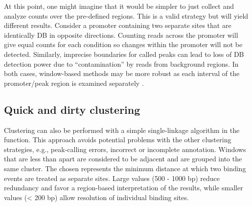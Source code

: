 \documentclass{report}\usepackage[]{graphicx}\usepackage[usenames,dvipsnames]{color}
\newcommand{\hlopt}[1]{\textcolor[rgb]{0,0,0}{#1}}%
\newcommand{\hlstd}[1]{\textcolor[rgb]{0.251,0.251,0.251}{#1}}%
\newcommand{\hlkwb}[1]{\textcolor[rgb]{0,0,0}{#1}}%
\newcommand{\hlkwd}[1]{\textcolor[rgb]{0.878,0.439,0.125}{#1}}%
\newenvironment{knitrout}{}{} %
\begin{document}
\begin{knitrout}
\color{fgcolor}
\end{knitrout}

At this point, one might imagine that it would be simpler to just collect and analyze counts over the pre-defined regions. 
This is a valid strategy but will yield different results. 
Consider a promoter containing two separate sites that are identically DB in opposite directions. 
Counting reads across the promoter will give equal counts for each condition so changes within the promoter will not be detected. 
Similarly, imprecise boundaries for called peaks can lead to loss of DB detection power due to ``contamination'' by reads from background regions. 
In both cases, window-based methods may be more robust as each interval of the promoter/peak region is examined separately \cite{lun2014}.

\subsection{Quick and dirty clustering}
\label{sec:cluster}
Clustering can also be performed with a simple single-linkage algorithm in the  function.
This approach avoids potential problems with the other clustering strategies, e.g., peak-calling errors, incorrect or incomplete annotation. 
Windows that are less than  apart are considered to be adjacent and are grouped into the same cluster.
The chosen  represents the minimum distance at which two binding events are treated as separate sites.
Large values (500 - 1000 bp) reduce redundancy and favor a region-based interpretation of the results, while smaller values (\textless{} 200 bp) allow resolution of individual binding sites.
\end{document}
